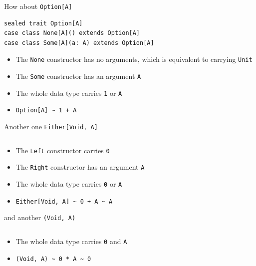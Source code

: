 \begin{frame}[fragile]
\begin{block}{How about \lstinline{Option[A]}}
\begin{lstlisting}[style=scala]
sealed trait Option[A]
case class None[A]() extends Option[A]
case class Some[A](a: A) extends Option[A]
\end{lstlisting}
\begin{itemize}
  \item<1-> The \lstinline{None} constructor has no arguments, which is equivalent to carrying \lstinline{Unit}
  \item<1-> The \lstinline{Some} constructor has an argument \lstinline{A}
  \item<2-> The whole data type carries \lstinline{1} or \lstinline{A}
  \item<2-> \lstinline{Option[A] ~ 1 + A}
\end{itemize}
\end{block}
\end{frame}

\begin{frame}[fragile]
\begin{block}{Another one \lstinline{Either[Void, A]}}
\begin{lstlisting}
\end{lstlisting}
\begin{itemize}
  \item<1-> The \lstinline{Left} constructor carries \lstinline{0}
  \item<1-> The \lstinline{Right} constructor has an argument \lstinline{A}
  \item<2-> The whole data type carries \lstinline{0} or \lstinline{A}
  \item<2-> \lstinline{Either[Void, A] ~ 0 + A ~ A}
\end{itemize}
\end{block}
\end{frame}

\begin{frame}[fragile]
\begin{block}{and another \lstinline{(Void, A)}}
\begin{lstlisting}
\end{lstlisting}
\begin{itemize}
  \item<1-> The whole data type carries \lstinline{0} and \lstinline{A}
  \item<2-> \lstinline{(Void, A) ~ 0 * A ~ 0}
\end{itemize}
\end{block}
\end{frame}

